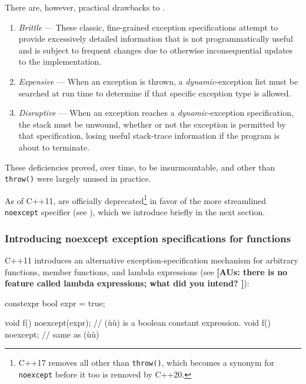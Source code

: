 \noindent There are, however, practical drawbacks to .
\begin{enumerate}
\item{\emph{Brittle} — These classic, fine-grained exception specifications attempt to provide excessively detailed information that is not programmatically useful and is subject to frequent changes due to otherwise inconsequential updates to the implementation.}
\item{\emph{Expensive} — When an exception is thrown, a \emph{dynamic}-exception list must be searched at run time to determine if that specific exception type is allowed.}
\item{\emph{Disruptive} — When an exception reaches a \emph{dynamic}-exception specification, the stack must be unwound, whether or not the exception is permitted by that specification, losing useful stack-trace information if the program is about to terminate.}
\end{enumerate}
These deficiencies proved, over time, to be insurmountable, and
 other than \lstinline!throw()!
were largely unused in practice.

As of C++11,  are officially
deprecated{\cprotect\footnote{C++17 removes all  other than \lstinline!throw()!, which becomes a
  synonym for \lstinline!noexcept! before it too is removed by C++20.}} in
favor of the more streamlined \lstinline!noexcept! specifier (see ), which we introduce briefly in the next section.

\subsubsection[Introducing \lstinline!noexcept! exception specifications for functions]{Introducing {\SubsubsecCode noexcept} exception specifications for functions}\label{introducing-noexcept-exception-specifications-for-functions}

C++11 introduces an alternative exception-specification mechanism for
arbitrary functions, member functions, and lambda expressions (see
\featureref{}{} \textbf{[AUs: there is no feature called lambda expressions; what did you intend? ]}):

\begin{emcppshiddenlisting}[emcppsbatch=e4]
constexpr bool expr = true;
\end{emcppshiddenlisting}
\begin{emcppslisting}[emcppsbatch=e4]
void f() noexcept(expr);  // (ù{}ù) is a boolean constant expression.
void f() noexcept;        // same as (ù{}ù)
\end{emcppslisting}
    

